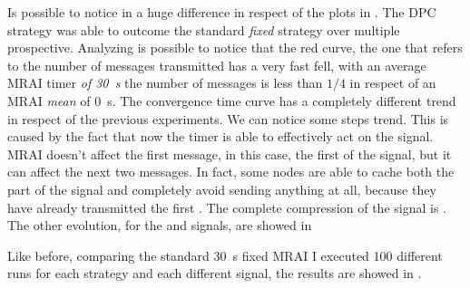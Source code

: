 Is possible to notice in  a huge difference
in respect of the plots in .
The \ac{DPC} strategy was able to outcome the standard \textit{fixed} strategy
over multiple prospective.
Analyzing  is possible to notice that
the red curve, the one that refers to the number of messages transmitted has
a very fast fell, with an average \ac{MRAI} timer \textit{of \SI{30}{\second}}
the number of messages is less than $1/4$ in respect of an \ac{MRAI} \textit{mean}
of \SI{0}{\second}.
The convergence time curve has a completely different trend in respect of the
previous experiments.
We can notice some steps trend.
This is caused by the fact that now the timer is able to effectively act on the signal.
\ac{MRAI} doesn't affect the first message, in this case, the first  of the
signal, but it can affect the next two messages.
In fact, some nodes are able to cache both the  part of the signal and
completely avoid sending anything at all, because they have already transmitted
the first .
The complete compression of the signal  is .
The other evolution, for the  and  signals, are showed in

Like before, comparing the standard \SI{30}{\second} fixed \ac{MRAI} I executed
\num{100} different runs for each strategy and each different signal, the results
are showed in .

